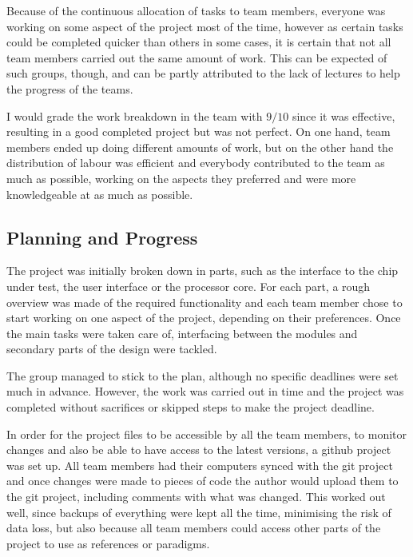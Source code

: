 Because of the continuous allocation of tasks to team members, everyone was working on some aspect of the project most of the time, however as certain tasks could be completed quicker than others in some cases, it is certain that not all team members carried out the same amount of work. This can be expected of such groups, though, and can be partly attributed to the lack of lectures to help the progress of the teams.

I would grade the work breakdown in the team with $9/10$ since it was effective, resulting in a good completed project but was not perfect. On one hand, team members ended up doing different amounts of work, but on the other hand the distribution of labour was efficient and everybody contributed to the team as much as possible, working on the aspects they preferred and were more knowledgeable at as much as possible.




\subsection{Planning and Progress}
\label{sec:planning}

%

The project was initially broken down in parts, such as the interface to the chip under test, the user interface or the processor core. For each part, a rough overview was made of the required functionality and each team member chose to start working on one aspect of the project, depending on their preferences. Once the main tasks were taken care of, interfacing between the modules and secondary parts of the design were tackled.

The group managed to stick to the plan, although no specific deadlines were set much in advance. However, the work was carried out in time and the project was completed without sacrifices or skipped steps to make the project deadline.

In order for the project files to be accessible by all the team members, to monitor changes and also be able to have access to the latest versions, a github project was set up. All team members had their computers synced with the git project and once changes were made to pieces of code the author would upload them to the git project, including comments with what was changed. This worked out well, since backups of everything were kept all the time, minimising the risk of data loss, but also because all team members could access other parts of the project to use as references or paradigms.

